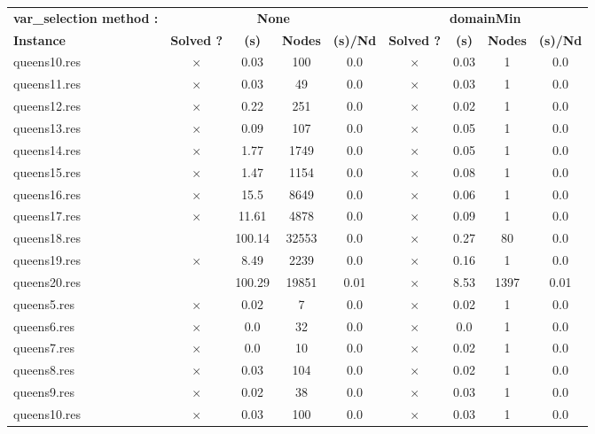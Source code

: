 \documentclass[main.tex]{subfiles}
\begin{document}
\thispagestyle{empty}

\begin{landscape}
\begin{center}
\renewcommand{\arraystretch}{1.4} 
\begin{tabular}{lcccccccc}
	\hline
\textbf{var_selection method :} & \multicolumn{4}{c}{\textbf{None}} & \multicolumn{4}{c}{\textbf{domainMin}}\\
\textbf{Instance}  & \textbf{Solved ?} & \textbf{(s)} & \textbf{Nodes} & \textbf{(s)/Nd} & \textbf{Solved ?} & \textbf{(s)} & \textbf{Nodes} & \textbf{(s)/Nd}\\\hline

queens10.res & $\times$ & 0.03 & 100 & 0.0
 & $\times$ & 0.03 & 1 & 0.0
\\
queens11.res & $\times$ & 0.03 & 49 & 0.0
 & $\times$ & 0.03 & 1 & 0.0
\\
queens12.res & $\times$ & 0.22 & 251 & 0.0
 & $\times$ & 0.02 & 1 & 0.0
\\
queens13.res & $\times$ & 0.09 & 107 & 0.0
 & $\times$ & 0.05 & 1 & 0.0
\\
queens14.res & $\times$ & 1.77 & 1749 & 0.0
 & $\times$ & 0.05 & 1 & 0.0
\\
queens15.res & $\times$ & 1.47 & 1154 & 0.0
 & $\times$ & 0.08 & 1 & 0.0
\\
queens16.res & $\times$ & 15.5 & 8649 & 0.0
 & $\times$ & 0.06 & 1 & 0.0
\\
queens17.res & $\times$ & 11.61 & 4878 & 0.0
 & $\times$ & 0.09 & 1 & 0.0
\\
queens18.res &  & 100.14 & 32553 & 0.0
 & $\times$ & 0.27 & 80 & 0.0
\\
queens19.res & $\times$ & 8.49 & 2239 & 0.0
 & $\times$ & 0.16 & 1 & 0.0
\\
queens20.res &  & 100.29 & 19851 & 0.01
 & $\times$ & 8.53 & 1397 & 0.01
\\
queens5.res & $\times$ & 0.02 & 7 & 0.0
 & $\times$ & 0.02 & 1 & 0.0
\\
queens6.res & $\times$ & 0.0 & 32 & 0.0
 & $\times$ & 0.0 & 1 & 0.0
\\
queens7.res & $\times$ & 0.0 & 10 & 0.0
 & $\times$ & 0.02 & 1 & 0.0
\\
queens8.res & $\times$ & 0.03 & 104 & 0.0
 & $\times$ & 0.02 & 1 & 0.0
\\
queens9.res & $\times$ & 0.02 & 38 & 0.0
 & $\times$ & 0.03 & 1 & 0.0
\\
queens10.res & $\times$ & 0.03 & 100 & 0.0
 & $\times$ & 0.03 & 1 & 0.0
\\

\end{tabular}
\end{center}
\end{landscape}
\end{document}
